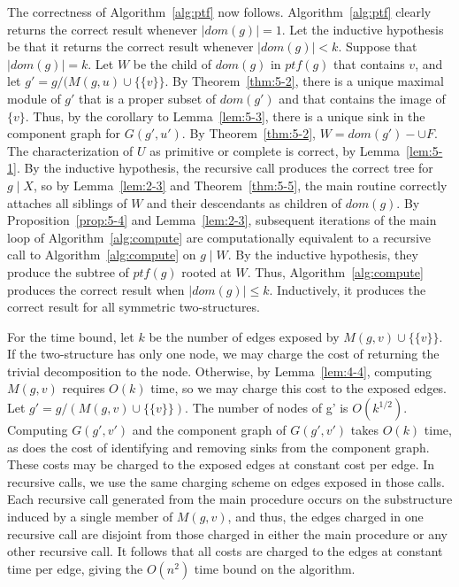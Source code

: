 The correctness of Algorithm~\ref{alg:ptf} now follows.
Algorithm~\ref{alg:ptf} clearly returns the correct result whenever $\mid dom(g) \mid = 1$.
Let the inductive hypothesis be that it returns the correct result whenever $\mid dom(g) \mid < k$.
Suppose that $\mid dom(g) \mid = k$.
Let $W$ be the child of $dom(g)$ in $ptf(g)$ that contains $v$, and let $g' = g/(M(g,u) \cup \{\{v\}\}$.
By Theorem~\ref{thm:5-2}, there is a unique maximal module of $g'$ that is a proper subset of $dom(g')$ and that contains the image of $\{v\}$.
Thus, by the corollary to Lemma~\ref{lem:5-3}, there is a unique sink in the component graph for $G(g',u')$.
By Theorem~\ref{thm:5-2}, $W = dom(g') - \cup F$.
The characterization of $U$ as primitive or complete is correct, by Lemma~\ref{lem:5-1}.
By the inductive hypothesis, the recursive call produces the correct tree for $g \mid X$, so by Lemma~\ref{lem:2-3} and Theorem~\ref{thm:5-5}, the main routine correctly attaches all siblings of $W$ and their descendants as children of $dom(g)$.
By Proposition~\ref{prop:5-4} and Lemma~\ref{lem:2-3}, subsequent iterations of the main loop of Algorithm~\ref{alg:compute} are computationally equivalent to a recursive call to Algorithm~\ref{alg:compute} on $g \mid W$.
By the inductive hypothesis, they produce the subtree of $ptf(g)$ rooted at $W$.
Thus, Algorithm~\ref{alg:compute} produces the correct result when $\mid dom(g) \mid \leq k$.
Inductively, it produces the correct result for all symmetric two-structures.

For the time bound, let $k$ be the number of edges exposed by $M(g, v) \cup \{\{v\}\}$.
If the two-structure has only one node, we may charge the cost of returning the trivial decomposition to the node.
Otherwise, by Lemma~\ref{lem:4-4}, computing$ M(g, v)$ requires $O(k)$ time, so we may charge this cost to the exposed edges.
Let $g' = g/(M(g, v) \cup \{\{v\}\})$.
The number of nodes of g' is $O(k^{1/2})$.
Computing $G(g',v')$ and the component graph of $G(g', v')$ takes $O(k)$ time, as does the cost of identifying and removing sinks from the component graph.
These costs may be charged to the exposed edges at constant cost per edge.
In recursive calls, we use the same charging scheme on edges exposed in those calls.
Each recursive call generated from the main procedure occurs on the substructure induced by a single member of $M(g, v)$, and thus, the edges charged in one recursive call are disjoint from those charged in either the main procedure or any other recursive call.
It follows that all costs are charged to the edges at constant time per edge, giving the $O(n^2)$ time bound on the algorithm.



